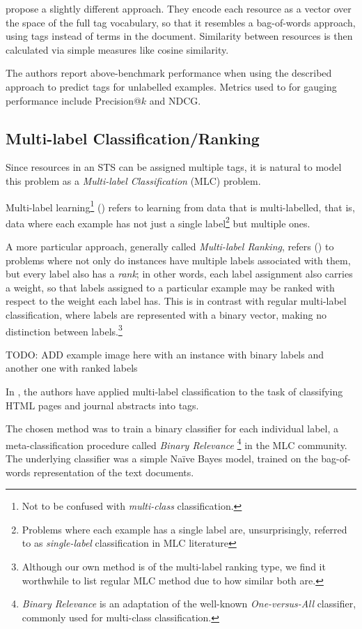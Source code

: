 \cite{auyeung_etal_2009} propose a slightly different approach. They encode each resource as a vector over the space of the full tag vocabulary, so that it resembles a bag-of-words approach, using tags instead of terms in the document. Similarity between resources is then calculated via simple measures like cosine similarity.

The authors report above-benchmark performance when using the described approach to predict tags for unlabelled examples. Metrics used to for gauging performance include Precision@$k$ and NDCG.


\subsection{Multi-label Classification/Ranking}

Since resources in an STS can be assigned multiple tags, it is natural to model this problem as a \textit{Multi-label Classification} (MLC) problem.

Multi-label learning\footnote{Not to be confused with \textit{multi-class} classification.} (\cite{tsoumakas_katakis_2007}) refers to learning from data that is multi-labelled, that is, data where each example has not just a single label\footnote{Problems where each example has a single label are, unsurprisingly, referred to as \textit{single-label} classification in MLC literature} but multiple ones.

A more particular approach, generally called \textit{Multi-label Ranking}, refers (\cite{illig_etal_2011}) to problems where not only do instances have multiple labels associated with them, but every label also has a \textit{rank}; in other words, each label assignment also carries a weight, so that labels assigned to a particular example may be ranked with respect to the weight each label has. This is in contrast with regular multi-label classification, where labels are represented with a binary vector, making no distinction between labels.\footnote{Although our own method is of the multi-label ranking type, we find it worthwhile to list regular MLC method due to how similar both are.}

{\color{red} TODO: ADD example image here with an instance with binary labels and another one with ranked labels}

In \cite{katakis_etal_2008}, the authors have applied multi-label classification to the task of classifying HTML pages and journal abstracts into tags.

The chosen method was to train a binary classifier for each individual label, a meta-classification procedure called \textit{Binary Relevance} \footnote{\textit{Binary Relevance} is an adaptation of the well-known \textit{One-versus-All} \citep{rifkin_klautau_2004} classifier, commonly used for multi-class classification.} in the MLC community. The underlying classifier was a simple Naïve Bayes model, trained on the bag-of-words representation of the text documents.


